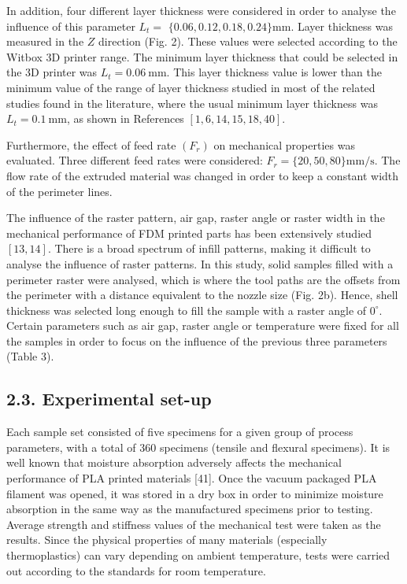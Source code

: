 \documentclass[10pt]{article}
\begin{document}
In addition, four different layer thickness were considered in order to analyse the influence of this parameter $L_{t}=$ $\{0.06,0.12,0.18,0.24\} \mathrm{mm}$. Layer thickness was measured in the $Z$ direction (Fig. 2). These values were selected according to the Witbox 3D printer range. The minimum layer thickness that could be selected in the 3D printer was $L_{t}=0.06 \mathrm{~mm}$. This layer thickness value is lower than the minimum value of the range of layer thickness studied in most of the related studies found in the literature, where the usual minimum layer thickness was $L_{t}=0.1 \mathrm{~mm}$, as shown in References $[1,6,14,15,18,40]$.

Furthermore, the effect of feed rate $\left(F_{r}\right)$ on mechanical properties was evaluated. Three different feed rates were considered: $F_{r}=\{20,50,80\} \mathrm{mm} / \mathrm{s}$. The flow rate of the extruded material was changed in order to keep a constant width of the perimeter lines.

The influence of the raster pattern, air gap, raster angle or raster width in the mechanical performance of FDM printed parts has been extensively studied $[13,14]$. There is a broad spectrum of infill patterns, making it difficult to analyse the influence of raster patterns. In this study, solid samples filled with a perimeter raster were analysed, which is where the tool paths are the offsets from the perimeter with a distance equivalent to the nozzle size (Fig. 2b). Hence, shell thickness was selected long enough to fill the sample with a raster angle of $0^{\circ}$. Certain parameters such as air gap, raster angle or temperature were fixed for all the samples in order to focus on the influence of the previous three parameters (Table 3).

\subsection*{2.3. Experimental set-up}
Each sample set consisted of five specimens for a given group of process parameters, with a total of 360 specimens (tensile and flexural specimens). It is well known that moisture absorption adversely affects the mechanical performance of PLA printed materials [41]. Once the vacuum packaged PLA filament was opened, it was stored in a dry box in order to minimize moisture absorption in the same way as the manufactured specimens prior to testing. Average strength and stiffness values of the mechanical test were taken as the results. Since the physical properties of many materials (especially thermoplastics) can vary depending on ambient temperature, tests were carried out according to the standards for room temperature.
\end{document}
